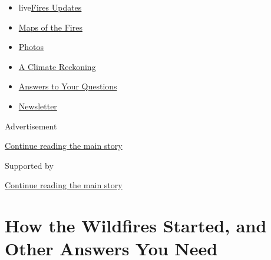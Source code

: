 \begin{itemize}
\tightlist
\item
  live\href{https://www.nytimes3xbfgragh.onion/2020/09/12/us/wildfires-live-updates.html?name=styln-california-wildfires\&region=TOP_BANNER\&block=storyline_menu_recirc\&action=click\&pgtype=Article\&impression_id=ae365b00-f52e-11ea-90d3-2f0ff35b997f\&variant=undefined}{Fires
  Updates}
\item
  \href{https://www.nytimes3xbfgragh.onion/interactive/2020/us/fires-map-tracker.html?name=styln-california-wildfires\&region=TOP_BANNER\&block=storyline_menu_recirc\&action=click\&pgtype=Article\&impression_id=ae365b01-f52e-11ea-90d3-2f0ff35b997f\&variant=undefined}{Maps
  of the Fires}
\item
  \href{https://www.nytimes3xbfgragh.onion/article/wildfires-photos-california-oregon-washington-state.html?name=styln-california-wildfires\&region=TOP_BANNER\&block=storyline_menu_recirc\&action=click\&pgtype=Article\&impression_id=ae365b02-f52e-11ea-90d3-2f0ff35b997f\&variant=undefined}{Photos}
\item
  \href{https://www.nytimes3xbfgragh.onion/2020/09/10/us/climate-change-california-wildfires.html?name=styln-california-wildfires\&region=TOP_BANNER\&block=storyline_menu_recirc\&action=click\&pgtype=Article\&impression_id=ae365b03-f52e-11ea-90d3-2f0ff35b997f\&variant=undefined}{A
  Climate Reckoning}
\item
  \href{https://www.nytimes3xbfgragh.onion/article/wildfires-california-oregon-washington.html?name=styln-california-wildfires\&region=TOP_BANNER\&block=storyline_menu_recirc\&action=click\&pgtype=Article\&impression_id=ae365b04-f52e-11ea-90d3-2f0ff35b997f\&variant=undefined}{Answers
  to Your Questions}
\item
  \href{https://www.nytimes3xbfgragh.onion/2020/09/09/us/california-wildfires.html?name=styln-california-wildfires\&region=TOP_BANNER\&block=storyline_menu_recirc\&action=click\&pgtype=Article\&impression_id=ae365b05-f52e-11ea-90d3-2f0ff35b997f\&variant=undefined}{Newsletter}
\end{itemize}

Advertisement

\protect\hyperlink{after-top}{Continue reading the main story}

Supported by

\protect\hyperlink{after-sponsor}{Continue reading the main story}

\hypertarget{how-the-wildfires-started-and-other-answers-you-need}{%
\section{How the Wildfires Started, and Other Answers You
Need}\label{how-the-wildfires-started-and-other-answers-you-need}}


